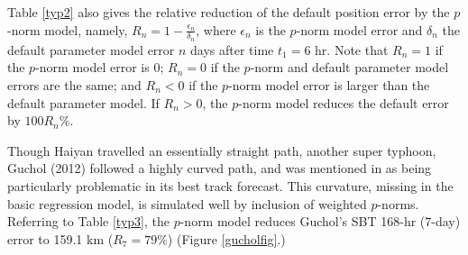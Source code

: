 \documentclass{SBCbookchapter}
\begin{document}
  {\flushleft Table} \ref{typ2} also gives the relative reduction of the default position error by the $p$-norm model, namely, $R_n=1 - \frac{\epsilon_n  }{\delta_n  }$,  where $\epsilon_n$ is the $p$-norm model error and $\delta_n$ the default parameter model error $n$ days after time $t_1=6$ hr.  Note that $R_n=1$ if the $p$-norm model error is 0;    $R_n=0$ if the $p$-norm and default parameter model  errors are the same;  and $R_n<0$ if the $p$-norm model error is larger than the default parameter model. If $R_n>0$, the $p$-norm model reduces the default error by $100R_n\%$.



Though Haiyan travelled an essentially straight path, another super typhoon, Guchol (2012) followed a highly curved path, and was mentioned in \cite{JMA} as being particularly problematic in its best track forecast.    This curvature, missing in the basic regression model, is simulated well by inclusion of weighted $p$-norms.   Referring to Table \ref{typ3}, the $p$-norm model reduces   Guchol's SBT 168-hr (7-day) error to 159.1 km ($R_{7}=79\%$) (Figure \ref{gucholfig}.)
\end{document}
